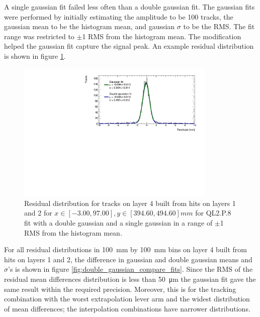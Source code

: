 A single gaussian fit failed less often than a double gaussian fit. The gaussian fits were performed by initially estimating the amplitude to be 100 tracks, the gaussian mean to be the histogram mean, and gaussian $\sigma$ to be the RMS. The fit range was restricted to $\pm$1 RMS from the histogram mean. The modification helped the gaussian fit capture the signal peak. An example residual distribution is shown in figure \ref{fig:double_gaussian_example_fit}. 


\begin{figure}
    \centering
    \includegraphics[width = 0.85\textwidth]{figures/figure_double_gaus_vs_gaus_example_fit_QL2P08_3100V_2021-06-18_and_2021-07-19_xbin_10_ybin_5_layer4_fixedlayers12.pdf}
    \caption{Residual distribution for tracks on layer 4 built from hits on layers 1 and 2 for $x\in\left[-3.00, 97.00\right],  y\in\left[394.60, 494.60\right] mm$ for QL2.P.8 fit with a double gaussian and a single gaussian in a range of $\pm$1 RMS from the histogram mean.}
    \label{fig:double_gaussian_example_fit}
\end{figure}

For all residual distributions in \SI{100}{\milli\meter} by \SI{100}{\milli\meter} bins on layer 4 built from hits on layers 1 and 2, the difference in gaussian and double gaussian means and $\sigma$'s is shown in figure \ref{fig:double_gaussian_compare_fits}. Since the RMS of the residual mean differences distribution is less than \SI{50}{\micro\meter} the gaussian fit gave the same result within the required precision. Moreover, this is for the tracking combination with the worst extrapolation lever arm and the widest distribution of mean differences; the interpolation combinations have narrower distributions. 

